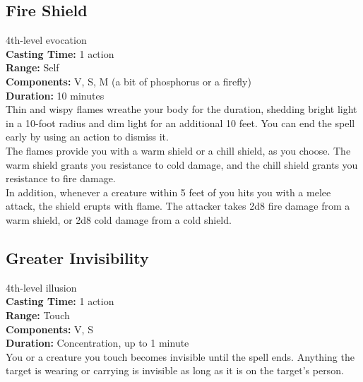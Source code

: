 \documentclass[11pt, A4paper, english]{article}
\begin{document}
		\subsection{Fire Shield}
4th-level evocation \\
\textbf{Casting Time:} 1 action \\
\textbf{Range:} Self \\
\textbf{Components:} V, S, M (a bit of phosphorus or a firefly) \\
\textbf{Duration:} 10 minutes \\
Thin and wispy flames wreathe your body for the duration, shedding bright light in a 10-foot radius and dim light for an additional 10 feet. You can end the spell early by using an action to dismiss it. \\
The flames provide you with a warm shield or a chill shield, as you choose. The warm shield grants you resistance to cold damage, and the chill shield grants you resistance to fire damage. \\
In addition, whenever a creature within 5 feet of you hits you with a melee attack, the shield erupts with flame. The attacker takes 2d8 fire damage from a warm shield, or 2d8 cold damage from a cold shield.

		\subsection{Greater Invisibility}
4th-level illusion \\
\textbf{Casting Time:} 1 action \\
\textbf{Range:} Touch \\
\textbf{Components:} V, S \\
\textbf{Duration:} Concentration, up to 1 minute \\
You or a creature you touch becomes invisible until the spell ends. Anything the target is wearing or carrying is invisible as long as it is on the target’s person.
\end{document}
